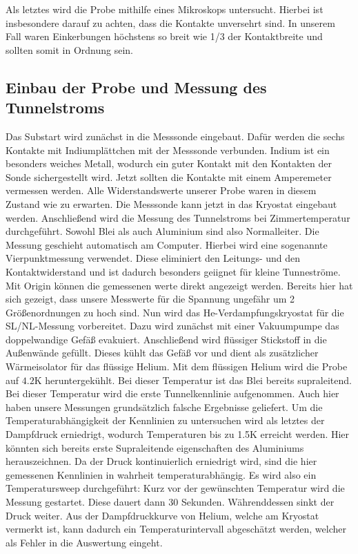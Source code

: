 \documentclass[twoside,        %
               BCOR12mm,       %
               english,ngerman, %
               fleqn,headsepline=false,footsepline=false
              ]{Vorlage/MFPREPORT}
\begin{document}
Als letztes wird die Probe mithilfe eines Mikroskops untersucht. Hierbei ist
insbesondere darauf zu achten, dass die Kontakte unversehrt sind. In unserem
Fall waren Einkerbungen höchstens so breit wie 1/3 der Kontaktbreite und
sollten somit in Ordnung sein.

\subsection{Einbau der Probe und Messung des Tunnelstroms}
Das Substart wird zunächst in die Messsonde eingebaut. Dafür werden die sechs
Kontakte mit Indiumplättchen mit der Messsonde verbunden. Indium ist ein
besonders weiches Metall, wodurch ein guter Kontakt mit den Kontakten der Sonde
sichergestellt wird. Jetzt sollten die Kontakte mit einem Amperemeter vermessen
werden. Alle Widerstandswerte unserer Probe waren in diesem Zustand wie zu
erwarten.
Die Messsonde kann jetzt in das Kryostat eingebaut werden. Anschließend wird
die Messung des Tunnelstroms bei Zimmertemperatur durchgeführt. Sowohl Blei als
auch Aluminium sind also Normalleiter. Die Messung geschieht automatisch am
Computer. Hierbei wird eine sogenannte Vierpunktmessung verwendet. Diese
eliminiert den Leitungs- und den Kontaktwiderstand und ist dadurch besonders
geiignet für kleine Tunneströme.
Mit Origin können die gemessenen werte direkt angezeigt werden.
Bereits hier hat sich gezeigt, dass unsere Messwerte für die Spannung
ungefähr um 2 Größenordnungen zu hoch sind.
Nun wird das He-Verdampfungskryostat für die SL/NL-Messung vorbereitet. Dazu wird zunächst mit einer Vakuumpumpe das doppelwandige Gefäß evakuiert. Anschließend wird flüssiger
Stickstoff in die Außenwände gefüllt. Dieses kühlt das Gefäß vor und dient als
zusätzlicher Wärmeisolator für das flüssige Helium. Mit dem flüssigen Helium
wird die Probe auf $4.2$\;K heruntergekühlt. Bei dieser Temperatur ist das Blei
bereits supraleitend. Bei dieser Temperatur wird die erste Tunnelkennlinie
aufgenommen. Auch hier haben unsere Messungen grundsätzlich falsche Ergebnisse
geliefert. Um die Temperaturabhängigkeit der Kennlinien zu untersuchen wird als
letztes der Dampfdruck erniedrigt, wodurch Temperaturen bis zu 1.5\;K erreicht
werden. Hier könnten sich bereits erste Supraleitende eigenschaften des
Aluminiums herauszeichnen. Da der Druck kontinuierlich erniedrigt wird, sind
die hier gemessenen Kennlinien in wahrheit temperaturabhängig. Es wird also ein
Temperatursweep durchgeführt: Kurz vor der gewünschten Temperatur wird die
Messung gestartet. Diese dauert dann 30 Sekunden. Währenddessen sinkt der Druck
weiter. Aus der Dampfdruckkurve von Helium, welche am Kryostat vermerkt ist,
kann dadurch ein Temperaturintervall abgeschätzt werden, welcher als Fehler in
die Auswertung eingeht.
\end{document}
